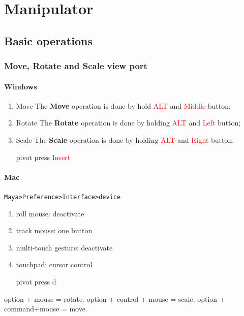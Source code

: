 
\chapter{Manipulator}

\section{Basic operations}

\subsection{Move, Rotate and Scale view port}

\subsubsection{Windows}
\begin{enumerate}
	\item Move
	The \textbf{Move} operation is done by hold \textcolor{red}{ALT} and \textcolor{red}{Middle} button;
	\item Rotate
	The \textbf{Rotate} operation is done by holding \textcolor{red}{ALT} and \textcolor{red}{Left} button;
	\item Scale
	The \textbf{Scale} operation is done by holding \textcolor{red}{ALT} and \textcolor{red}{Right} button.
	\item[pivot] press \textcolor{red}{Insert}
\end{enumerate}

\subsubsection{Mac}
\lstinline{Maya>Preference>Interface>device}
\begin{enumerate}
	\item roll mouse: deactivate
	\item track mouse: one button
	\item multi-touch gesture: deactivate
	\item touchpad: cursor control
\end{enumerate}

\begin{enumerate}
\item[pivot] press \textcolor{red}{d}
\end{enumerate}
option + mouse = rotate.
option + control + mouse = scale.
option + command+mouse = move.

